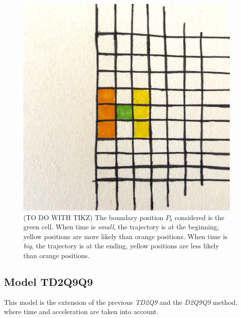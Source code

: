 \documentclass[class=article, crop=false]{standalone}
\begin{document}
\begin{figure}[h]
\centering
\includegraphics[scale=0.1]{draw/Boundary_position_in_out}
\captionsetup{width=.6\linewidth}
\caption{(TO DO WITH TIKZ) The boundary position $P_b$ considered is the green cell.
When time is \emph{small}, the trajectory is at the beginning, yellow positions are more likely than orange positions.
When time is \emph{big}, the trajectory is at the ending, yellow positions are less likely than orange positions.}
\label{fig:boundary_position}
\end{figure}


\FloatBarrier
\subsection{Model TD2Q9Q9}
This model is the extension of the previous \emph{TD2Q9} and the \emph{D2Q9Q9} method, where time and acceleration are taken into account.
\end{document}
